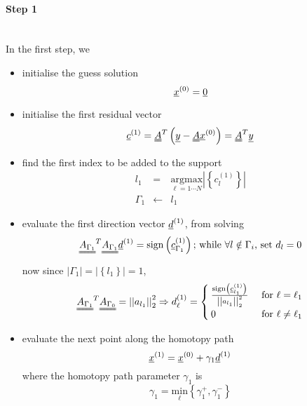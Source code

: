 \documentclass[11pt]{article} %
\begin{document}
\paragraph{Step 1} \ \\
In the first step, we
\begin{itemize}
\item initialise the guess solution
\begin{equation}
\uline{x}^{(0)} = \uline{0}
\end{equation}
\item initialise the first residual vector
\begin{equation}
\uline{c}^{(1)} = \uuline{A}^T \left(\uline{y} - \uuline{A}\uline{x}^{(0)}\right) = \uuline{A}^T \uline{y}
\end{equation}
\item find the first index to be added to the support
\begin{eqnarray}
l_1 & = & \underset{\ell = 1 \cdots N}{\mathrm{argmax}} \left| \left\{ c_l^{(1)} \right\} \right|\\
\Gamma_1 &\leftarrow & l_1
\end{eqnarray}
\item evaluate the first direction vector $\uline{d}^{(1)}$, from solving
\begin{equation}
\uuline{A_{\Gamma_1}}^T \uuline{A_{\Gamma_1}} \uline{d}^{(1)} = \mathrm{sign} \left(\uline{c}^{(1)}_{\Gamma_1}\right)  \text{; while } \forall l \notin \Gamma_i \text{, set  } d_l = 0
\end{equation}
now since $\left| \Gamma_1 \right| =\left| \left\{ l_1\right\} \right| = 1$,
\begin{equation}
\uuline{A_{\Gamma_1}}^T \uuline{A_{\Gamma_0}} = \left| \left| a_{l_1} \right| \right|_2^2 \Rightarrow d_{\ell}^{(1)} = \begin{cases} \frac{\mathrm{sign} \left(\uline{c}^{(1)}_{l_1}\right)}{ \left| \left| a_{l_1} \right| \right|_2^2} & \text{ for } \ell = \ell_1 \\
0 & \text{ for } \ell \neq \ell_1
\end{cases}
\end{equation}
\item evaluate the next point along the homotopy path
\begin{equation}
\uline{x}^{(1)} = \uline{x}^{(0)} + \gamma_1  \uline{d}^{(1)}
\end{equation}
where the homotopy path parameter $\gamma_1$ is
\begin{equation}
\gamma_1 = \underset{\ell}{\mathrm{min}}\left\{ \gamma_1^+, \gamma_1^-\right\}

\end{equation}
\end{itemize}
\end{document}
